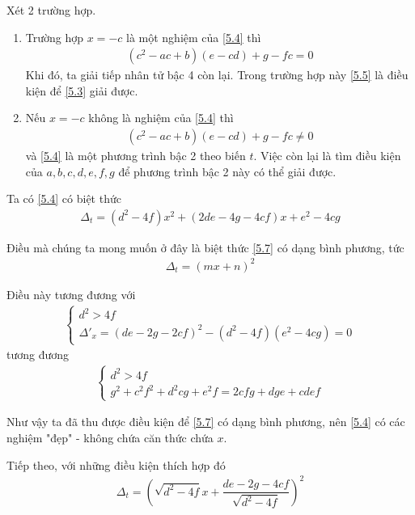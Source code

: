 \documentclass[a4paper,oneside]{book}
\numberwithin{equation}{chapter}
\begin{document}
Xét 2 trường hợp.
\begin{enumerate}
\item Trường hợp $x =  - c$ là một nghiệm của \eqref{5.4} thì
\begin{align}
\label{5.5}
\left( {{c^2} - ac + b} \right)\left( {e - cd} \right) + g - fc = 0
\end{align}
Khi đó, ta giải tiếp nhân tử bậc 4 còn lại. Trong trường hợp này \eqref{5.5} là điều kiện để \eqref{5.3} giải được.
\item Nếu $x =  - c$ không là nghiệm của \eqref{5.4} thì 
\begin{align}
\label{a}
\left( {{c^2} - ac + b} \right)\left( {e - cd} \right) + g - fc \ne 0
\end{align}
và \eqref{5.4} là một phương trình bậc 2 theo biến $t$. Việc còn lại là tìm điều kiện của $a,b,c,d,e,f,g$ để phương trình bậc 2 này có thể giải được.
\end{enumerate}

Ta có \eqref{5.4} có biệt thức 
\begin{align}
\label{5.7}
{\Delta _t} = \left( {{d^2} - 4f} \right){x^2} + \left( {2de - 4g - 4cf} \right)x + {e^2} - 4cg
\end{align}

Điều mà chúng ta mong muốn ở đây là biệt thức \eqref{5.7} có dạng bình phương, tức 
\begin{align}
{\Delta _t} = {\left( {mx + n} \right)^2}
\end{align}

Điều này tương đương với
\begin{align}
\left\{ {\begin{array}{*{20}{c}}
{{d^2} > 4f}\\
{\Delta {'_x} = {{\left( {de - 2g - 2cf} \right)}^2} - \left( {{d^2} - 4f} \right)\left( {{e^2} - 4cg} \right) = 0}
\end{array}} \right.
\end{align}
tương đương
\begin{align}
\left\{ {\begin{array}{*{20}{c}}
{{d^2} > 4f}\\
{{g^2} + {c^2}{f^2} + {d^2}cg + {e^2}f = 2cfg + dge + cdef}
\end{array}} \right.
\end{align}

Như vậy ta đã thu được điều kiện để \eqref{5.7} có dạng bình phương, nên \eqref{5.4} có các nghiệm "đẹp" - không chứa căn thức chứa $x$.

Tiếp theo, với những điều kiện thích hợp đó
\begin{align}
{\Delta _t} = {\left( {\sqrt {{d^2} - 4f} x + \dfrac{{de - 2g - 4cf}}{{\sqrt {{d^2} - 4f} }}} \right)^2}
\end{align}
\end{document}

